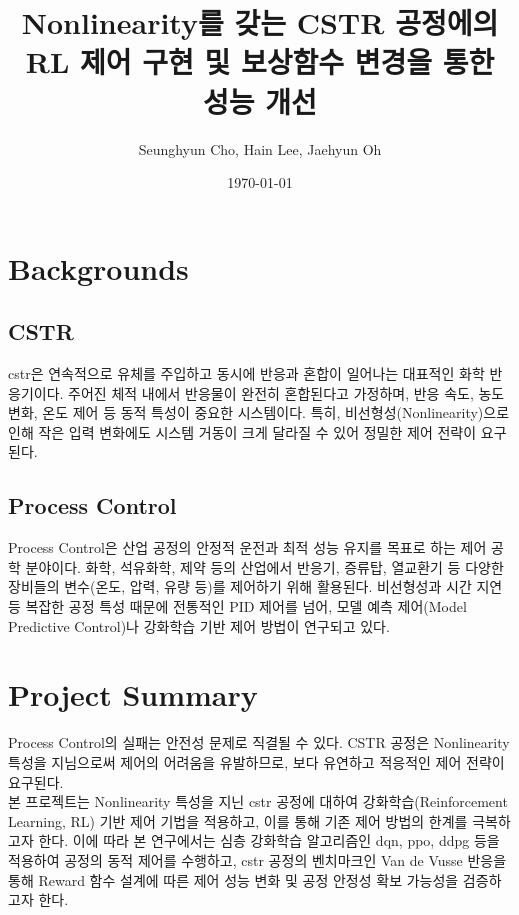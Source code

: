 \documentclass[11pt]{article}
\begin{document}
\title{Nonlinearity를 갖는 CSTR 공정에의 RL 제어 구현 및 보상함수 변경을 통한 성능 개선}
\author{Seunghyun Cho, Hain Lee, Jaehyun Oh}
\date{\today}


\setlength{\droptitle}{-4cm}  %
\maketitle

 
\section{Backgrounds}
\subsection{CSTR}
\gls{cstr}은 연속적으로 유체를 주입하고 동시에 반응과 혼합이 일어나는 대표적인 화학 반응기이다. 
주어진 체적 내에서 반응물이 완전히 혼합된다고 가정하며, 반응 속도, 농도 변화, 온도 제어 등 동적 특성이 중요한 시스템이다. 
특히, 비선형성(Nonlinearity)으로 인해 작은 입력 변화에도 시스템 거동이 크게 달라질 수 있어 정밀한 제어 전략이 요구된다.


\subsection{Process Control}
Process Control은 산업 공정의 안정적 운전과 최적 성능 유지를 목표로 하는 제어 공학 분야이다. 
화학, 석유화학, 제약 등의 산업에서 반응기, 증류탑, 열교환기 등 다양한 장비들의 변수(온도, 압력, 유량 등)를 제어하기 위해 활용된다. 
비선형성과 시간 지연 등 복잡한 공정 특성 때문에 전통적인 PID 제어를 넘어, 모델 예측 제어(Model Predictive Control)나 강화학습 기반 제어 방법이 연구되고 있다.



\section{Project Summary}
Process Control의 실패는 안전성 문제로 직결될 수 있다.
CSTR 공정은 Nonlinearity 특성을 지님으로써 제어의 어려움을 유발하므로, 보다 유연하고 적응적인 제어 전략이 요구된다.\\
본 프로젝트는 Nonlinearity 특성을 지닌 \gls{cstr} 공정에 대하여 강화학습(Reinforcement Learning, RL) 기반 제어 기법을 적용하고, 이를 통해 기존 제어 방법의 한계를 극복하고자 한다.
이에 따라 본 연구에서는 심층 강화학습 알고리즘인 \gls{dqn}, \gls{ppo}, \gls{ddpg} 등을 적용하여 공정의 동적 제어를 수행하고,
\gls{cstr} 공정의 벤치마크인 Van de Vusse 반응을 통해 Reward 함수 설계에 따른 제어 성능 변화 및 공정 안정성 확보 가능성을 검증하고자 한다.
\end{document}
